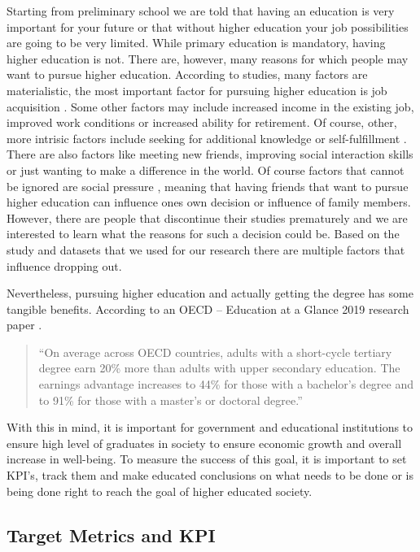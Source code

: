 \documentclass[
  letterpaper,
  DIV=11,
  numbers=noendperiod]{scrartcl}
\begin{document}
Starting from preliminary school we are told that having an education is
very important for your future or that without higher education your job
possibilities are going to be very limited. While primary education is
mandatory, having higher education is not. There are, however, many
reasons for which people may want to pursue higher education. According
to studies, many factors are materialistic, the most important factor
for pursuing higher education is job acquisition
\autocite{knutsen_motivation_2011}. Some other factors may include
increased income in the existing job, improved work conditions or
increased ability for retirement. Of course, other, more intrisic
factors include seeking for additional knowledge or self-fulfillment
\autocite{cortes_factors_2023}. There are also factors like meeting new
friends, improving social interaction skills or just wanting to make a
difference in the world. Of course factors that cannot be ignored are
social pressure \autocite{temple_factors_2009}, meaning that having
friends that want to pursue higher education can influence ones own
decision or influence of family members. However, there are people that
discontinue their studies prematurely and we are interested to learn
what the reasons for such a decision could be. Based on the study and
datasets that we used for our research there are multiple factors that
influence dropping out.

Nevertheless, pursuing higher education and actually getting the degree
has some tangible benefits. According to an OECD -- Education at a
Glance 2019 research paper \autocite{oecd_education_2019}.

\begin{quote}
\enquote{On average across OECD countries, adults with a short-cycle
tertiary degree earn 20\% more than adults with upper secondary
education. The earnings advantage increases to 44\% for those with a
bachelor's degree and to 91\% for those with a master's or doctoral
degree.}
\end{quote}

With this in mind, it is important for government and educational
institutions to ensure high level of graduates in society to ensure
economic growth and overall increase in well-being. To measure the
success of this goal, it is important to set KPI's, track them and make
educated conclusions on what needs to be done or is being done right to
reach the goal of higher educated society.

\hypertarget{sec-kpi}{%
\subsection{Target Metrics and KPI}\label{sec-kpi}}
\end{document}
